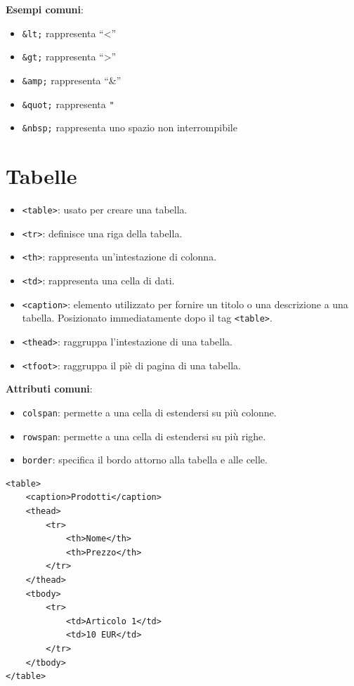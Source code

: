 \textbf{Esempi comuni}:
\begin{itemize}
    \item \texttt{\&lt;} rappresenta ``<''
    \item \texttt{\&gt;} rappresenta ``>''
    \item \texttt{\&amp;} rappresenta ``\&''
    \item \texttt{\&quot;} rappresenta \texttt{"}
    \item \texttt{\&nbsp;} rappresenta uno spazio non interrompibile
\end{itemize}

\section{Tabelle}

\begin{itemize}
    \item \texttt{<table>}: usato per creare una tabella.
    \item \texttt{<tr>}: definisce una riga della tabella.
    \item \texttt{<th>}: rappresenta un'intestazione di colonna.
    \item \texttt{<td>}: rappresenta una cella di dati.
    \item \texttt{<caption>}: elemento utilizzato per fornire un titolo o una descrizione a una tabella. Posizionato immediatamente dopo il tag \texttt{<table>}.
    \item \texttt{<thead>}: raggruppa l'intestazione di una tabella.
    \item \texttt{<tfoot>}: raggruppa il piè di pagina di una tabella.
\end{itemize}

\textbf{Attributi comuni}:
\begin{itemize}
    \item \texttt{colspan}: permette a una cella di estendersi su più colonne.
    \item \texttt{rowspan}: permette a una cella di estendersi su più righe.
    \item \texttt{border}: specifica il bordo attorno alla tabella e alle celle.
\end{itemize}

\begin{lstlisting}[language=HTML5, caption=Esempio di tabella]
<table>
    <caption>Prodotti</caption>
    <thead>
        <tr>
            <th>Nome</th>
            <th>Prezzo</th>
        </tr>
    </thead>
    <tbody>
        <tr>
            <td>Articolo 1</td>
            <td>10 EUR</td>
        </tr>
    </tbody>
</table>
\end{lstlisting}

